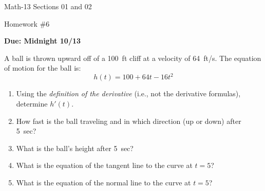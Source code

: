 \documentclass[letterpaper,12pt,fleqn]{article}
\begin{document}
\begin{center}
  \large
  Math-13 Sections 01 and 02

  \Large
  Homework \#6

  \large
  \textbf{Due: Midnight 10/13}
\end{center}

A ball is thrown upward off of a \SI{100}{ft} cliff at a velocity of \SI{64}{ft/s}.  The equation of motion for the
ball is:
\[h(t)=100+64t-16t^2\]
\begin{enumerate}[left=0in]
\item Using the \emph{definition of the derivative} (i.e., not the derivative formulas), determine \(h'(t)\).
\item How fast is the ball traveling and in which direction (up or down) after \SI{5}{sec}?
\item What is the ball's height after \SI{5}{sec}?
\item What is the equation of the tangent line to the curve at \(t=5\)?
\item What is the equation of the normal line to the curve at \(t=5\)?
\end{enumerate}
\end{document}
